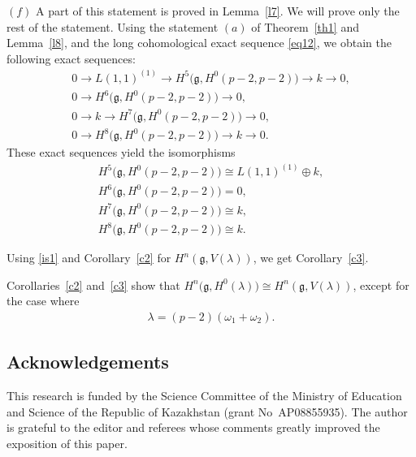 \documentclass[10pt,a4paper]{amsart}
\numberwithin{equation}{section}
\begin{document}
$(f)$ A part of this statement is proved in Lemma~\ref{l7}. We will prove only the rest of the statement. Using the statement $(a)$ of Theorem~\ref{th1} and Lemma~\ref{l8}, and the long cohomological exact sequence \eqref{eq12}, we obtain the following exact sequences:
\begin{gather*}
0\longrightarrow L(1,1)^{(1)}\longrightarrow H^5\big(\mathfrak{g},H^0(p-2,p-2)\big)\longrightarrow k \longrightarrow 0,
\\
0\longrightarrow H^6\big(\mathfrak{g},H^0(p-2,p-2)\big)\longrightarrow 0,
\\
0\longrightarrow k\longrightarrow H^7\big(\mathfrak{g},H^0(p-2,p-2)\big)\longrightarrow 0,
\\
0\longrightarrow H^8\big(\mathfrak{g},H^0(p-2,p-2)\big)\longrightarrow k \longrightarrow 0.
\end{gather*}
These exact sequences yield the isomorphisms
\begin{gather*}
H^5\big(\mathfrak{g},H^0(p-2,p-2)\big)\cong L(1,1)^{(1)}\oplus k,
\\
H^6\big(\mathfrak{g},H^0(p-2,p-2)\big)=0,
\\
H^7\big(\mathfrak{g},H^0(p-2,p-2)\big)\cong k,
\\
H^8\big(\mathfrak{g},H^0(p-2,p-2)\big)\cong k.
\end{gather*}

Using \eqref{is1} and Corollary~\ref{c2} for $H^n(\mathfrak{g},V(\lambda))$, we get Corollary~\ref{c3}.

Corollaries~\ref{c2} and~\ref{c3} show that $H^n\big(\mathfrak{g},H^0(\lambda)\big)\cong H^n(\mathfrak{g},V(\lambda))$, except for the case where \begin{gather*}
 \lambda=(p-2)(\omega_1+\omega_2).
 \end{gather*}

\subsection*{Acknowledgements}

This research is funded by the Science Committee of the Ministry of Education and Science of the Republic of Kazakhstan (grant No~AP08855935).
The author is grateful to the editor and referees whose comments greatly improved the exposition of this paper.

\end{document}
